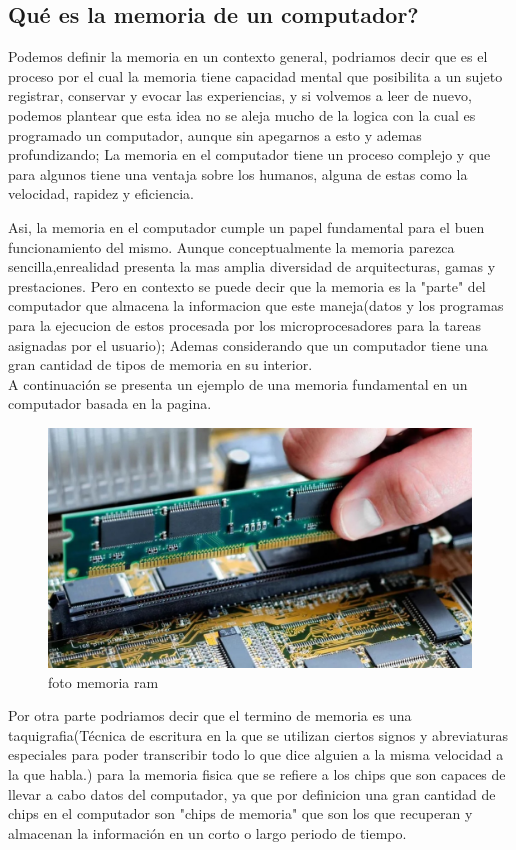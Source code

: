 \documentclass{article}
\begin{document}
    \subsection{Qué es la memoria de un computador?}
    Podemos definir la memoria en un contexto general, podriamos decir que es el proceso por el cual la memoria tiene capacidad mental que posibilita a un sujeto registrar, conservar y evocar las experiencias\cite{hipocampo}, y si volvemos a leer de nuevo, podemos plantear que esta idea no se aleja mucho de la logica con la cual es programado un computador, aunque sin apegarnos a esto y ademas profundizando; La memoria en el computador tiene un proceso complejo y que para algunos tiene una ventaja sobre los humanos, alguna de estas como la velocidad, rapidez y eficiencia.
    
    Asi, la memoria en el computador cumple un papel fundamental para el buen funcionamiento del mismo. Aunque conceptualmente la memoria parezca sencilla,enrealidad presenta la mas amplia diversidad de arquitecturas, gamas y prestaciones\cite{academia}.
    Pero en contexto se puede decir que la memoria es la "parte" del computador que almacena la informacion que este maneja(datos y los programas para la ejecucion de estos procesada por los microprocesadores para la tareas asignadas por el usuario); Ademas considerando que un computador tiene una gran cantidad de tipos de memoria en su interior.\\
    
    A continuación se presenta un ejemplo de una memoria fundamental en un computador basada en la pagina.\cite{xalaca}
    
    \begin{figure}[h]
    \includegraphics[width=6 cm]{imagenes/tipo_memoria.jpg}
    \centering
    \caption{foto memoria ram}
    \label{fig:tipo_memoria}
    \end{figure}

    Por otra parte podriamos decir que el termino de memoria es una taquigrafia(Técnica de escritura en la que se utilizan ciertos signos y abreviaturas especiales para poder transcribir todo lo que dice alguien a la misma velocidad a la que habla.)\cite{monografias} para la memoria fisica que se refiere a los chips que son capaces de llevar a cabo datos del computador, ya que por definicion una gran cantidad de chips en el computador son "chips de memoria" que son los que recuperan y almacenan la información en un corto o largo periodo de tiempo.
    
\end{document}
